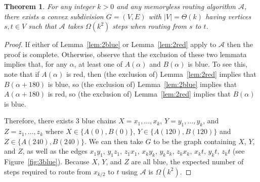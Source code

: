 \documentclass [letterpaper] {patmorin}
\newtheorem{theorem}{Theorem}%
\begin{document}
\begin{theorem}
  \label{thm:quadratic}
  For any integer $k> 0$ and any 
  memoryless routing algorithm $\mathcal{A}$,
  there exists a convex subdivision $G=(V,E)$ with $|V|=\Theta(k)$ having vertices $s,t\in V$ such that $\mathcal{A}$ takes $\Omega(k^2)$ steps when routing from $s$ to $t$.
\end{theorem}

\begin{proof}
If either of Lemma~\ref{lem:2blue} or Lemma~\ref{lem:2red} apply to $\mathcal{A}$ then the proof is complete.  Otherwise, observe that the exclusion of these two lemmata implies that, for any $\alpha$, at least one of $A(\alpha)$ and $B(\alpha)$ is blue.  To see this, note that if $A(\alpha)$ is red, then (the exclusion of) Lemma~\ref{lem:2red} implies that $B(\alpha+180)$ is blue, so (the exclusion of) Lemma~\ref{lem:2blue} implies that $A(\alpha+180)$ is red, so (the exclusion of) Lemma~\ref{lem:2red} implies that $B(\alpha)$ is blue.

Therefore, there exists 3 blue chains $X=x_1,\ldots,x_k$, $Y=y_1,\ldots,y_k$, and $Z=z_1,\ldots,z_k$ where $X\in\{A(0),B(0)\}$, $Y\in\{A(120),B(120)\}$ and $Z\in\{A(240),B(240)\}$.
We can then take $G$ to be the graph containing $X$, $Y$, and $Z$,
as well as the edges $x_1y_1$, $y_1z_1$, $z_1x_1$, $x_ky_k$, $y_kz_k$,
$z_kx_k$, $x_kt$, $y_kt$, $z_kt$ (see Figure~\ref{fig:3blue}).  Because
$X$, $Y$, and $Z$ are all blue, the expected number of steps required
to route from $x_{k/2}$ to $t$ using $\mathcal{A}$ is $\Omega(k^2)$.


\end{proof}
\end{document}
